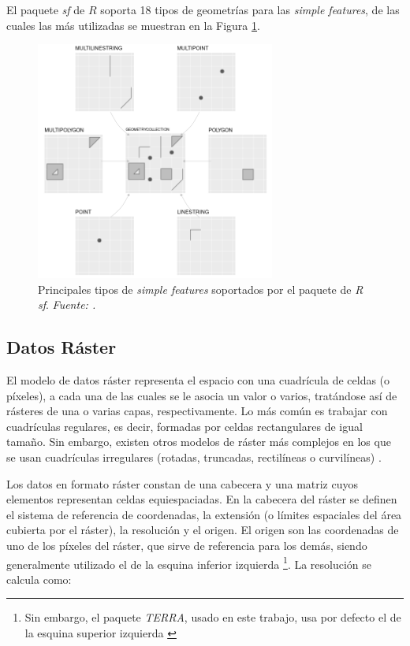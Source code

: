 \documentclass[12pt,a4paper,]{book}
\let\rmarkdownfootnote\footnote%
\def\footnote{\protect\rmarkdownfootnote}
\numberwithin{dummy}{section}
\theoremstyle{ocrenumbox}
\theoremstyle{blacknumex}
\theoremstyle{blacknumbox}
\theoremstyle{ocrenum}
\theoremstyle{ocrenum}
\begin{document}
El paquete \emph{sf} de \(R\) soporta 18 tipos de geometrías para las
\emph{simple features}, de las cuales las más utilizadas se muestran en
la Figura \ref{fig:sf-classes}.

\begin{figure}[H]
\centering
\includegraphics[width = 0.7\textwidth]{graficos/sf-classes.png}
\caption[Principales tipos de \textit{simple features} soportados por el paquete de \textit{R sf}]{Principales tipos de \textit{simple features} soportados por el paquete de \textit{R sf}. \it Fuente: \citet{lovelace_geocomputation_2019}.}
\label{fig:sf-classes}
\end{figure}

\hypertarget{datos-ruxe1ster}{%
\subsection{Datos Ráster}\label{datos-ruxe1ster}}

El modelo de datos ráster representa el espacio con una cuadrícula de
celdas (o píxeles), a cada una de las cuales se le asocia un valor o
varios, tratándose así de rásteres de una o varias capas,
respectivamente. Lo más común es trabajar con cuadrículas regulares, es
decir, formadas por celdas rectangulares de igual tamaño. Sin embargo,
existen otros modelos de ráster más complejos en los que se usan
cuadrículas irregulares (rotadas, truncadas, rectilíneas o curvilíneas)
\citep{lovelace_geocomputation_2019}.

Los datos en formato ráster constan de una cabecera y una matriz cuyos
elementos representan celdas equiespaciadas. En la cabecera del ráster
se definen el sistema de referencia de coordenadas, la extensión (o
límites espaciales del área cubierta por el ráster), la resolución y el
origen. El origen son las coordenadas de uno de los píxeles del ráster,
que sirve de referencia para los demás, siendo generalmente utilizado el
de la esquina inferior izquierda \footnote{Sin embargo, el paquete
  \emph{TERRA}, usado en este trabajo, usa por defecto el de la esquina
  superior izquierda \citep{terrapackage}}. La resolución se calcula
como:
\end{document}
